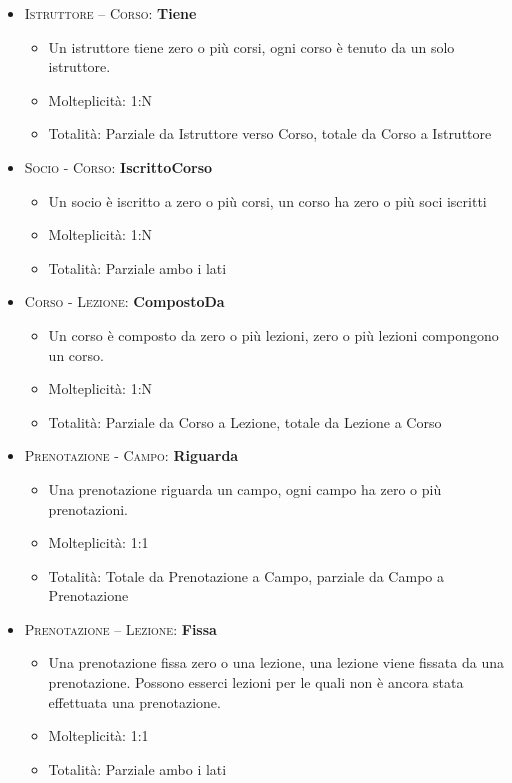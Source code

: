 \begin{itemize}
\item \textsc{Istruttore – Corso:} \textbf{Tiene}
\begin{itemize}
\item Un istruttore tiene zero o più corsi, ogni corso è tenuto da un solo istruttore.
\item Molteplicità: 1:N
\item Totalità: Parziale da Istruttore verso Corso, totale da Corso a Istruttore
\end{itemize}
\item \textsc{Socio - Corso:} \textbf{IscrittoCorso}
\begin{itemize}
\item Un socio è iscritto a zero o più corsi, un corso ha zero o più soci iscritti
\item Molteplicità: 1:N
\item Totalità: Parziale ambo i lati
\end{itemize}
\item \textsc{Corso - Lezione:} \textbf{CompostoDa}
\begin{itemize}
\item Un corso è composto da zero o più lezioni, zero o più lezioni compongono un corso.
\item Molteplicità: 1:N
\item Totalità: Parziale da Corso a Lezione, totale da Lezione a Corso
\end{itemize}
\item \textsc{Prenotazione - Campo:} \textbf{Riguarda}
\begin{itemize}
\item Una prenotazione riguarda un campo, ogni campo ha zero o più prenotazioni.
\item Molteplicità: 1:1
\item Totalità: Totale da Prenotazione a Campo, parziale da Campo a Prenotazione 
\end{itemize}
\item \textsc{Prenotazione – Lezione:} \textbf{Fissa}
\begin{itemize}
\item Una prenotazione fissa zero o una lezione, una lezione viene fissata da una prenotazione. Possono esserci lezioni per le quali non è ancora stata effettuata una prenotazione.
\item Molteplicità: 1:1
\item Totalità: Parziale ambo i lati
\end{itemize}
\end{itemize}

